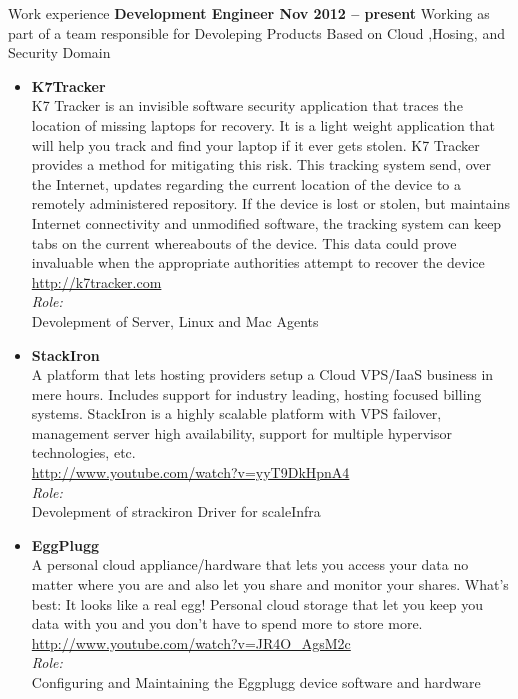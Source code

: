 \documentclass{resume}
\begin{document}
\begin{category}{Work experience}
  \citemnobullet \textbf{{Development Engineer} \hfill Nov 2012 -- present}
  \citemnobullet Working as part of a team responsible for Devoleping Products Based on Cloud ,Hosing, and Security Domain
  \begin{itemize}

  \item {{\bfseries K7Tracker} \\
  K7 Tracker is an invisible software security application that traces the location of missing
  laptops for recovery. It is a light weight application that will help you track and find your
  laptop if it ever gets stolen. K7 Tracker provides a method for mitigating this risk. This
  tracking system send, over the Internet, updates regarding the current location of the device
  to a remotely administered repository. If the device is lost or stolen, but maintains Internet
  connectivity and unmodified software, the tracking system can keep tabs on the current
  whereabouts of the device. This data could prove invaluable when the appropriate authorities attempt to recover the device\\
  \url{http://k7tracker.com}\\
  {\it Role:}\\
  Devolepment of Server, Linux and Mac Agents\\
  }

  \item {{\bfseries StackIron} \\
  A platform that lets hosting providers setup a Cloud VPS/IaaS business in mere hours. 
  Includes support for industry leading, hosting focused billing systems. 
  StackIron is a highly scalable platform with VPS failover, management server high availability,
  support for multiple hypervisor technologies, etc.\\
  \url{http://www.youtube.com/watch?v=yyT9DkHpnA4}\\
  {\it Role:}\\
  Devolepment of strackiron Driver for scaleInfra\\
  } 

  \item{{\bfseries EggPlugg} \\
  A personal cloud appliance/hardware that lets you access your data no matter where you 
  are and also let you share and monitor your shares. What's best: It looks like a real egg! 
  Personal cloud storage that let you keep you data with you and you don't have to spend more to store more. \\
  \url{http://www.youtube.com/watch?v=JR4O_AgsM2c}\\
  {\it Role:}\\
  Configuring and Maintaining the Eggplugg device software and hardware\\
  }


\end{itemize}
\end{category}
\end{document}
